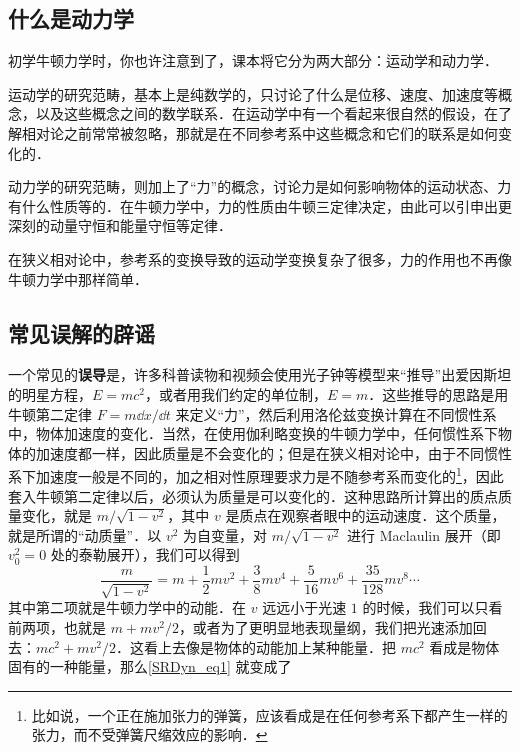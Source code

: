 




\subsection{什么是动力学}
初学牛顿力学时，你也许注意到了，课本将它分为两大部分：运动学和动力学．

运动学的研究范畴，基本上是纯数学的，只讨论了什么是位移、速度、加速度等概念，以及这些概念之间的数学联系．在运动学中有一个看起来很自然的假设，在了解相对论之前常常被忽略，那就是在不同参考系中这些概念和它们的联系是如何变化的．

动力学的研究范畴，则加上了“力”的概念，讨论力是如何影响物体的运动状态、力有什么性质等的．在牛顿力学中，力的性质由牛顿三定律决定，由此可以引申出更深刻的动量守恒和能量守恒等定律．

在狭义相对论中，参考系的变换导致的运动学变换复杂了很多，力的作用也不再像牛顿力学中那样简单．

\subsection{常见误解的辟谣}
一个常见的\textbf{误导}是，许多科普读物和视频会使用光子钟等模型来“推导”出爱因斯坦的明星方程，$E=mc^2$，或者用我们约定的单位制，$E=m$．这些推导的思路是用牛顿第二定律 $F=m\dd x/\dd t$ 来定义“力”，然后利用洛伦兹变换计算在不同惯性系中，物体加速度的变化．当然，在使用伽利略变换的牛顿力学中，任何惯性系下物体的加速度都一样，因此质量是不会变化的；但是在狭义相对论中，由于不同惯性系下加速度一般是不同的，加之相对性原理要求力是不随参考系而变化的\footnote{比如说，一个正在施加张力的弹簧，应该看成是在任何参考系下都产生一样的张力，而不受弹簧尺缩效应的影响．}，因此套入牛顿第二定律以后，必须认为质量是可以变化的．这种思路所计算出的质点质量变化，就是 $m/\sqrt{1-v^2}$，其中 $v$ 是质点在观察者眼中的运动速度．这个质量，就是所谓的“动质量”．以 $v^2$ 为自变量，对 $m/\sqrt{1-v^2}$ 进行 Maclaulin 展开（即 $v_0^2=0$ 处的泰勒展开），我们可以得到
\begin{equation}\label{SRDyn_eq1}
\frac{m}{\sqrt{1-v^2}} = m+\frac{1}{2}mv^2+\frac{3}{8}mv^4+\frac{5}{16}mv^6 + \frac{35}{128}mv^8\cdots
\end{equation}
其中第二项就是牛顿力学中的动能．在 $v$ 远远小于光速 $1$ 的时候，我们可以只看前两项，也就是 $m+mv^2/2$，或者为了更明显地表现量纲，我们把光速添加回去：$mc^2+mv^2/2$．这看上去像是物体的动能加上某种能量．把 $mc^2$ 看成是物体固有的一种能量，那么\autoref{SRDyn_eq1} 就变成了


